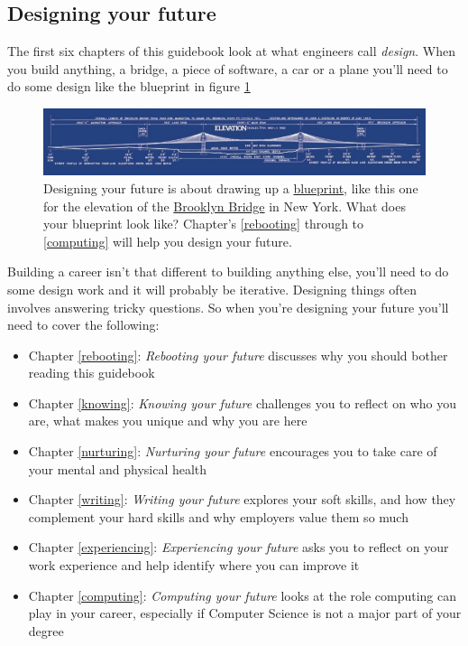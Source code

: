 \documentclass[
]{book}
\providecommand{\tightlist}{%
  \setlength{\itemsep}{0pt}\setlength{\parskip}{0pt}}
\begin{document}
\hypertarget{parti}{%
\subsection{Designing your future}\label{parti}}

The first six chapters of this guidebook look at what engineers call \emph{design}. When you build anything, a bridge, a piece of software, a car or a plane you'll need to do some design like the blueprint in figure \ref{fig:brooklyn-fig}

\begin{figure}

{\centering \includegraphics[width=1\linewidth]{images/brooklyn-bridge-blueprint} 

}

\caption{Designing your future is about drawing up a \href{https://en.wikipedia.org/wiki/Blueprint}{blueprint}, like this one for the elevation of the \href{https://en.wikipedia.org/wiki/Brooklyn_Bridge}{Brooklyn Bridge} in New York. What does your blueprint look like? Chapter's \ref{rebooting} through to \ref{computing} will help you design your future.}\label{fig:brooklyn-fig}
\end{figure}



Building a career isn't that different to building anything else, you'll need to do some design work and it will probably be iterative. Designing things often involves answering tricky questions. So when you're designing your future you'll need to cover the following:

\begin{itemize}
\tightlist
\item
  Chapter \ref{rebooting}: \emph{Rebooting your future} discusses why you should bother reading this guidebook
\item
  Chapter \ref{knowing}: \emph{Knowing your future} challenges you to reflect on who you are, what makes you unique and why you are here
\item
  Chapter \ref{nurturing}: \emph{Nurturing your future} encourages you to take care of your mental and physical health
\item
  Chapter \ref{writing}: \emph{Writing your future} explores your soft skills, and how they complement your hard skills and why employers value them so much
\item
  Chapter \ref{experiencing}: \emph{Experiencing your future} asks you to reflect on your work experience and help identify where you can improve it
\item
  Chapter \ref{computing}: \emph{Computing your future} looks at the role computing can play in your career, especially if Computer Science is not a major part of your degree
\end{itemize}
\end{document}
